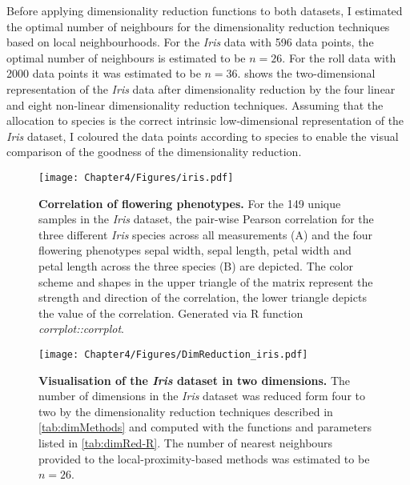 Before applying dimensionality reduction functions to both datasets, I estimated the optimal number of neighbours for the dimensionality reduction techniques based on local neighbourhoods. For the \textit{Iris} data with \num{596} data points, the optimal number of neighbours is estimated to be \(n=26\). For the roll data with \num{2000} data points it was estimated to be \(n=36\).  shows the two-dimensional representation of the \textit{Iris} data after dimensionality reduction by the four linear and eight non-linear dimensionality reduction techniques. Assuming that the allocation to species is the correct intrinsic low-dimensional representation of the \textit{Iris} dataset, I coloured the data points according to species to enable the visual comparison of the goodness of the dimensionality reduction.

\begin{figure}[h]
	\centering
			\texttt{[image: Chapter4/Figures/iris.pdf]}		
	\caption[\textbf{Correlation of flowering phenotypes.}]{\textbf{Correlation of flowering phenotypes.} For the \num{149} unique samples in the \textit{Iris} dataset, the pair-wise  Pearson correlation for the three different \textit{Iris} species across all measurements (A) and the four flowering phenotypes sepal width, sepal length, petal width and petal length across the three species (B) are depicted. The color scheme and shapes in the upper triangle of the matrix represent the strength and direction of the correlation, the lower triangle depicts the value of the correlation. Generated via R function \textit{corrplot::corrplot}.} 
		\label{fig:iris}
\end{figure}%

\begin{figure}[h!]
	\centering
	\texttt{[image: Chapter4/Figures/DimReduction\_iris.pdf]}
	\caption[\textbf{Visualisation of the \textit{Iris} dataset in two dimensions.}]{\textbf{Visualisation of the \textit{Iris} dataset in two dimensions.} The number of dimensions in the \textit{Iris} dataset was reduced form four to two by the dimensionality reduction techniques described in \cref{tab:dimMethods} and computed with the functions and parameters listed in \cref{tab:dimRed-R}. The number of nearest neighbours provided to the local-proximity-based methods was estimated to be \(n=26\).} 
	 	\label{fig:dimRed-iris}
\end{figure}

